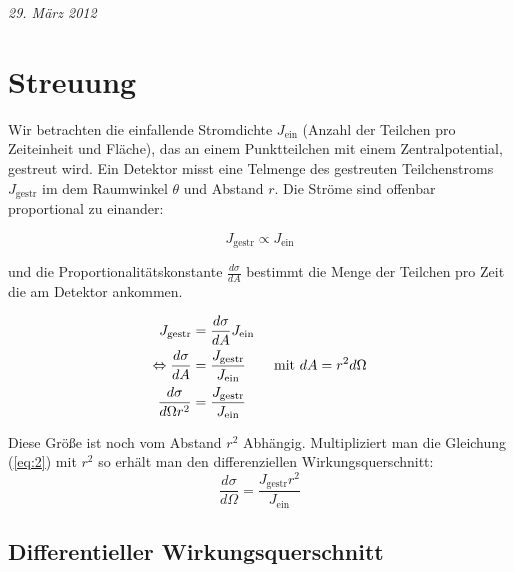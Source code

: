 
\graphicspath{{./streuung_pics}}%
\usepackage{amsmath} 





\textit{29. März 2012}


\section*{Streuung}


Wir betrachten die einfallende Stromdichte \(J_{\text{ein}}\) (Anzahl der Teilchen pro Zeiteinheit und Fläche), das an einem Punktteilchen mit einem Zentralpotential, gestreut wird. Ein Detektor misst eine Telmenge des gestreuten Teilchenstroms \(J_{\text{gestr}}\) im dem Raumwinkel \(\theta\) und Abstand \(r\). Die Ströme sind offenbar proportional zu einander:

\begin{equation}
  \label{eq:1}
  J_{\text{gestr}} \propto J_{\text{ein}}
\end{equation}


\begin{figure}
  \centering
  
\end{figure}


und die Proportionalitätskonstante \(\frac{d\sigma}{dA}\) bestimmt die Menge der Teilchen pro Zeit die am Detektor ankommen. 

\begin{align}
  \label{eq:2}
  J_{\text{gestr}} &= \frac{d\sigma}{dA} J_{\text{ein}}\notag\\
\Leftrightarrow \frac{d\sigma}{dA} &= \frac{ J_{\text{gestr}} }{J_{\text{ein}}} \qquad \text{mit }dA=r^2d\Omega\notag\\
\frac{d\sigma}{d\Omega r^2} &= \frac{ J_{\text{gestr}} }{J_{\text{ein}}} 
\end{align}

Diese Größe ist noch vom Abstand \(r^2\) Abhängig. Multipliziert man die Gleichung (\ref{eq:2}) mit \(r^2\) so erhält man den differenziellen Wirkungsquerschnitt:
\begin{equation}
  \label{eq:3}
  \boxed{ \frac{d\sigma}{d\Omega} = \frac{ J_{\text{gestr}}r^2 }{J_{\text{ein}}} }
\end{equation}


\subsection*{Differentieller Wirkungsquerschnitt}

